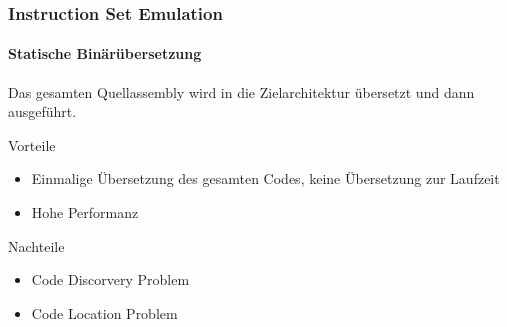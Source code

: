 \begin{frame}
    \frametitle{Instruction Set Emulation}
    \framesubtitle{Statische Binärübersetzung}

    Das gesamten Quellassembly  wird in die Zielarchitektur übersetzt und dann ausgeführt.

    \vspace{0.50cm}

    \begin{exampleblock}{Vorteile}
        \begin{itemize}
            \item[$\textcolor{TUMGreen}\blacksquare$] Einmalige Übersetzung des gesamten Codes, keine Übersetzung zur Laufzeit
            \item[$\textcolor{TUMGreen}\blacksquare$] Hohe Performanz
        \end{itemize}
    \end{exampleblock}

    \vspace{0.50cm}

    \begin{alertblock}{Nachteile}
        \begin{itemize}
            \item[$\textcolor{TUMOrange}\blacksquare$] Code Discorvery Problem
            \item[$\textcolor{TUMOrange}\blacksquare$] Code Location Problem
        \end{itemize}
    \end{alertblock}
\end{frame}